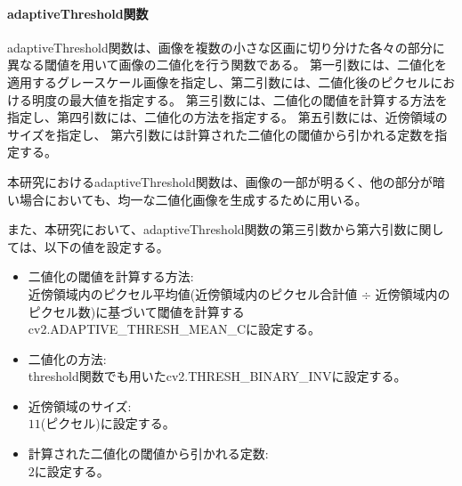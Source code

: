 \paragraph{adaptiveThreshold関数}
adaptiveThreshold関数は、画像を複数の小さな区画に切り分けた各々の部分に異なる閾値を用いて画像の二値化を行う関数である。
第一引数には、二値化を適用するグレースケール画像を指定し、第二引数には、二値化後のピクセルにおける明度の最大値を指定する。
第三引数には、二値化の閾値を計算する方法を指定し、第四引数には、二値化の方法を指定する。
第五引数には、近傍領域のサイズを指定し、
第六引数には計算された二値化の閾値から引かれる定数を指定する。
\par
本研究におけるadaptiveThreshold関数は、画像の一部が明るく、他の部分が暗い場合においても、均一な二値化画像を生成するために用いる。
\par
また、本研究において、adaptiveThreshold関数の第三引数から第六引数に関しては、以下の値を設定する。
\begin{itemize}
      \setlength{\itemsep}{0pt}
            \setlength{\parsep}{0pt}
      \item 二値化の閾値を計算する方法:\\
            近傍領域内のピクセル平均値(近傍領域内のピクセル合計値 $\div$ 近傍領域内のピクセル数)に基づいて閾値を計算するcv2.ADAPTIVE\_THRESH\_MEAN\_C\cite{AdaptiveThreshold}に設定する。
      \item 二値化の方法:\\
            threshold関数でも用いたcv2.THRESH\_BINARY\_INV\cite{Threshold}に設定する。
      \item 近傍領域のサイズ:\\
            $11$(ピクセル)に設定する。
      \item 計算された二値化の閾値から引かれる定数:\\
            $2$に設定する。
\end{itemize}
